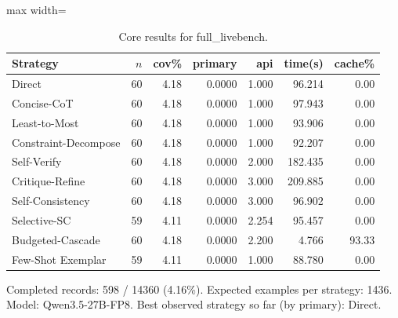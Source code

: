 \documentclass[10pt,twocolumn]{article}
\begin{document}
\begin{table}[t]
\centering
\caption{Core results for full\_livebench.}
\label{tab:full_livebench_core}
\begin{adjustbox}{max width=\textwidth}
\begin{tabular}{lrrrrrr}
\toprule
Strategy & $n$ & cov\% & primary & api & time(s) & cache\% \\
\midrule
Direct & 60 & 4.18 & 0.0000 & 1.000 & 96.214 & 0.00 \\
Concise-CoT & 60 & 4.18 & 0.0000 & 1.000 & 97.943 & 0.00 \\
Least-to-Most & 60 & 4.18 & 0.0000 & 1.000 & 93.906 & 0.00 \\
Constraint-Decompose & 60 & 4.18 & 0.0000 & 1.000 & 92.207 & 0.00 \\
Self-Verify & 60 & 4.18 & 0.0000 & 2.000 & 182.435 & 0.00 \\
Critique-Refine & 60 & 4.18 & 0.0000 & 3.000 & 209.885 & 0.00 \\
Self-Consistency & 60 & 4.18 & 0.0000 & 3.000 & 96.902 & 0.00 \\
Selective-SC & 59 & 4.11 & 0.0000 & 2.254 & 95.457 & 0.00 \\
Budgeted-Cascade & 60 & 4.18 & 0.0000 & 2.200 & 4.766 & 93.33 \\
Few-Shot Exemplar & 59 & 4.11 & 0.0000 & 1.000 & 88.780 & 0.00 \\
\bottomrule
\end{tabular}
\end{adjustbox}
\vspace{2pt}\parbox{0.98\textwidth}{\footnotesize Completed records: 598 / 14360 (4.16\%). Expected examples per strategy: 1436. Model: Qwen3.5-27B-FP8. Best observed strategy so far (by primary): Direct.}
\end{table}
\end{document}
